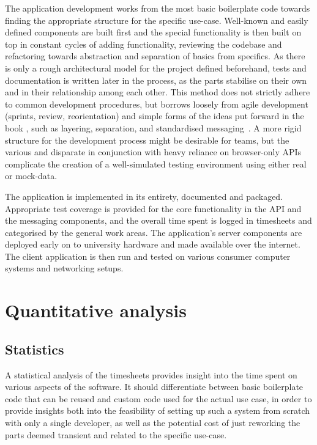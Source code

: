 The application development works from the most basic boilerplate code towards finding the appropriate structure for the specific use-case.
Well-known and easily defined components are built first and the special functionality is then built on top in constant cycles of adding functionality, reviewing the codebase and refactoring towards abstraction and separation of basics from specifics.
As there is only a rough architectural model for the project defined beforehand, tests and documentation is written later in the process, as the parts stabilise on their own and in their relationship among each other.
This method does not strictly adhere to common development procedures, but borrows loosely from agile development (sprints, review, reorientation) and simple forms of the ideas put forward in the book , such as layering, separation, and standardised messaging~\parencite{patternOrientedSoftwareArchitecture}.
A more rigid structure for the development process might be desirable for teams, but the various and disparate  in conjunction with heavy reliance on browser-only \ac{API}s complicate the creation of a well-simulated testing environment using either real or mock-data.

The application is implemented in its entirety, documented and packaged.
Appropriate test coverage is provided for the core functionality in the API and the messaging components, and the overall time spent is logged in timesheets and categorised by the general work areas.
The application's server components are deployed early on to university hardware and made available over the internet.
The client application is then run and tested on various consumer computer systems and networking setups.


\section{Quantitative analysis}
\label{sec:quantitative-analysis}

\subsection{Statistics}

A statistical analysis of the timesheets provides insight into the time spent on various aspects of the software.
It should differentiate between basic boilerplate code that can be reused and custom code used for the actual use case, in order to provide insights both into the feasibility of setting up such a system from scratch with only a single developer, as well as the potential cost of just reworking the parts deemed transient and related to the specific use-case.

